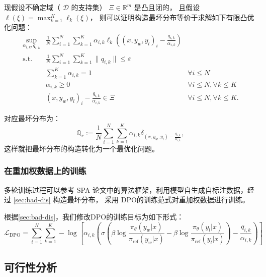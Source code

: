 现假设不确定域（ $\mathcal{D}$ 的支持集） $\Xi \in \mathbb{R}^m$ 是凸且闭的，
且假设 $\ell(\xi) = \max_{k=1}^K \ell_k(\xi)$，
则可以证明构造最坏分布等价于求解如下有限凸优化问题：
\begin{equation}
    \begin{aligned}
        \sup_{\alpha_{i,k}, q_{i,k}} &
        \frac1N \sum_{i=1}^N \sum_{k=1}^K \alpha_{i,k} \ell_{k} ((x, y_w, y_l)_i - \frac{q_{i,k}}{\alpha_{i,k}}) \\
        \text{s.t.} & \frac1N \sum_{i=1}^N\sum_{k=1}^K \| q_{i,k} \| \leq \varepsilon \\
        & \sum_{k=1}^K \alpha_{i,k} = 1 & \forall i \leq N \\ & \alpha_{i,k} \geq 0 & \forall i\leq N, \forall k \leq K \\
        & (x,y_w,y_l)_i - \frac{q_{i,k}}{\alpha_{i,k}} \in \Xi & \forall i \leq N, \forall k \leq K.
    \end{aligned}
\end{equation}

对应最坏分布为：
\begin{equation}
    \mathbb{Q}_r := \frac1N \sum_{i=1}^N \sum_{k=1}^K \alpha_{i,k} \delta_{(x, y_w, y_l) - \frac{q_{i,k}}{\alpha_{i,k}}},
\end{equation}
这样就把最坏分布的构造转化为一个最优化问题。

\subsubsection{在重加权数据上的训练}

多轮训练过程可以参考 SPA\citep{kim2025spread} 论文中的算法框架，利用模型自生成自标注数据，经过 \ref{sec:bad-dis} 构造最坏分布，
采用 DPO\citep{rafailov2023direct}的训练范式对重加权数据进行训练。

根据\ref{sec:bad-dis}，我们修改DPO的训练目标为如下形式：
\begin{equation}
    \mathcal{L}_{\text{DPO}} = \sum_{i=1}^N \sum_{k=1}^K -\log  \left[\alpha_{i,k}\left( \sigma \left( \beta \log \dfrac{\pi_{\theta}(y_w | x)}{\pi_{\text{ref}} (y_w |x)} -  \beta \log \dfrac{\pi_{\theta}(y_l | x)}{\pi_{\text{ref}} (y_l |x)} \right)- \frac{q_{i,k}}{\alpha_{i,k}}\right)\right] 
\end{equation}

\subsection{可行性分析}

